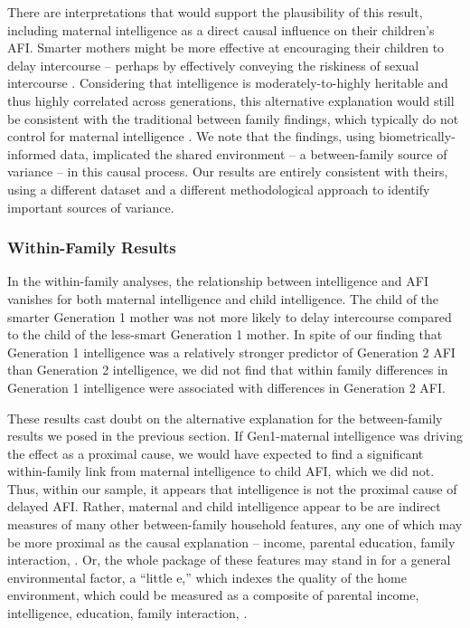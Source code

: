 \documentclass[a4paper,man,apacite,natbib,12pt,longtable]{apa6}\usepackage[]{graphicx}\usepackage[]{color}
\begin{document}
There are interpretations that would support the plausibility of this result, including maternal intelligence as a direct causal influence on their children's AFI. Smarter mothers might be more effective at encouraging their children to delay intercourse -- perhaps by effectively conveying the riskiness of sexual intercourse \citep{hutchinson2003role,mathews2009predictors}. Considering that intelligence is moderately-to-highly heritable \citep{Bouchard2004} and thus highly correlated across generations, this alternative explanation would still be consistent with the traditional between family findings, which typically do not control for maternal intelligence \citep{halpern2000smart,mott1983early,Paul2000,Woodward2001}. We note that the \citet{harden2011don} findings, using biometrically-informed data, implicated the shared environment -- a between-family source of variance -- in this causal process. Our results are entirely consistent with theirs, using a different dataset and a different methodological approach to identify important sources of variance.
 
\subsubsection{Within-Family Results} In the within-family analyses, the relationship between intelligence and AFI vanishes for both maternal intelligence and child intelligence. The child of the smarter Generation 1 mother was not more likely to delay intercourse compared to the child of the less-smart Generation 1 mother. In spite of our finding that Generation 1 intelligence was a relatively stronger predictor of Generation 2 AFI than Generation 2 intelligence, we did not find that within family differences in Generation 1 intelligence were associated with differences in Generation 2 AFI.

These results cast doubt on the alternative explanation for the between-family results we posed in the previous section. If Gen1-maternal intelligence was driving the effect as a proximal cause, we would have expected to find a significant within-family link from maternal intelligence to child AFI, which we did not. Thus, within our sample, it appears that intelligence is not the proximal cause of delayed AFI. Rather, maternal and child intelligence appear to be are indirect measures of many other between-family household features, any one of which may be more proximal as the causal explanation -- income, parental education, family interaction, \etc. Or, the whole package of these features may stand in for a general environmental factor, a ``little e,'' which indexes the quality of the home environment, which could be measured as a composite of parental income, intelligence, education, family interaction, \etc.
%
\end{document}
